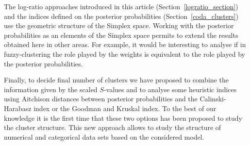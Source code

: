 \documentclass[submit]{smj}
\theoremstyle{definition}
\begin{document}
The log-ratio approaches introduced in this article (Section~\ref{logratio_section}) and the indices defined on the posterior probabilities (Section~\ref{coda_clusters}) use the geometric structure of the Simplex space. Working with the posterior probabilities as an elements of the Simplex space permits to extend the results obtained here in other areas. For example, it would be interesting to analyse if in fuzzy-clustering the role played by the weights is equivalent to the role played by the posterior probabilities. 

Finally, to decide final number of clusters we have proposed to combine the information given by the scaled $S$-values and to analyse some heuristic indices using Aitchison distances between posterior probabilities and  the Calinski-Harabasz index or  the Goodman and Kruskal index. To the best of our knowledge it is the first time that these two options has been proposed to study the cluster structure. This new approach allows to study the structure of numerical and categorical data sets based on the considered model.


\end{document}
